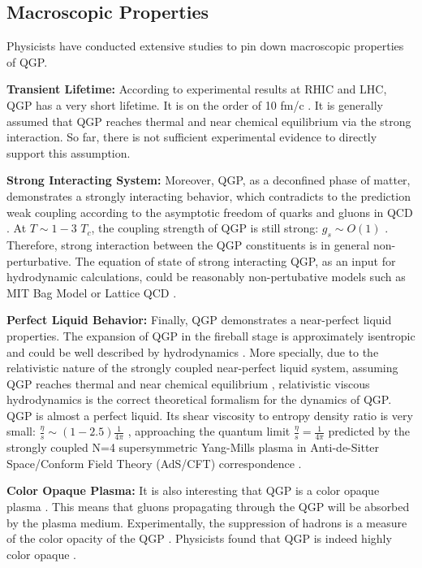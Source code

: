 
\subsection{Macroscopic Properties}

Physicists have conducted extensive studies to pin down macroscopic properties of QGP. 

\textbf{Transient Lifetime:} According to experimental results at RHIC and LHC, QGP has a very short lifetime. It is on the order of 10 fm/c \cite{QGPLifeTime}. It is generally assumed that QGP reaches thermal \cite{QGPThermal} and near chemical equilibrium \cite{QGPChemical} via the strong interaction. So far, there is not sufficient experimental evidence to directly support this assumption.

\textbf{Strong Interacting System:} Moreover, QGP, as a deconfined phase of matter, demonstrates a strongly interacting behavior, which contradicts to the prediction weak coupling according to the asymptotic freedom of quarks and gluons in QCD \cite{QCDAsym}. At $T \sim 1 - 3$ $T_c$, the coupling strength of QGP is still strong: $g_s \sim O(1)$ \cite{sQGP}. Therefore, strong interaction between the QGP constituents is in general non-perturbative. The equation of state of strong interacting QGP, as an input for hydrodynamic calculations, could be reasonably non-pertubative models such as MIT Bag Model or Lattice QCD \cite{LatticeEOS}. 

\textbf{Perfect Liquid Behavior:} Finally, QGP demonstrates a near-perfect liquid properties. The expansion of QGP in the fireball stage is approximately isentropic and could be well described by hydrodynamics \cite{Bjorken}. More specially, due to the relativistic nature of the strongly coupled near-perfect liquid system, assuming QGP reaches thermal \cite{QGPThermal} and near chemical equilibrium \cite{QGPChemical}, relativistic viscous hydrodynamics \cite{4DHydro} is the correct theoretical formalism for the dynamics of QGP. QGP is almost a perfect liquid. Its shear viscosity to entropy density ratio is very small: $\frac{\eta}{s}\sim (1 - 2.5) \frac{1}{4\pi}$ \cite{QGPEtaOverS}, approaching the quantum limit $\frac{\eta}{s} = \frac{1}{4\pi}$ predicted by the strongly coupled N=4 supersymmetric Yang-Mills plasma in Anti-de-Sitter Space/Conform Field Theory (AdS/CFT) correspondence \cite{ADSCFT}.

\textbf{Color Opaque Plasma:} It is also interesting that QGP is a color opaque plasma \cite{QGPGen}. This means that gluons propagating through the QGP will be absorbed by the plasma medium. Experimentally, the suppression of hadrons is a measure of the color opacity of the QGP \cite{QGPGen}. Physicists found that QGP is indeed highly color opaque \cite{QGPOpaque}.


